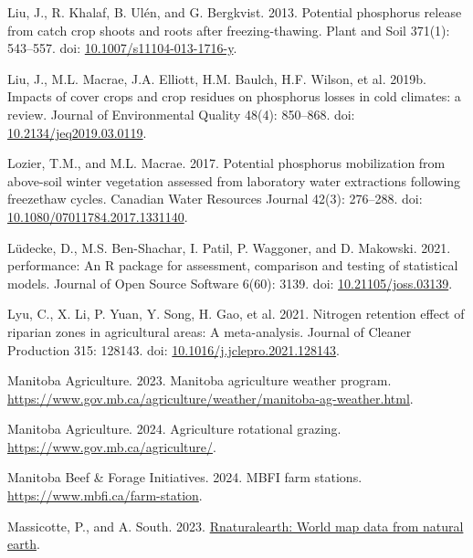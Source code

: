 \documentclass[
]{agujournal2019}
\newlength{\cslhangindent}
\newenvironment{CSLReferences}[2] %
 {\begin{list}{}{%
  \setlength{\itemindent}{0pt}
  \setlength{\leftmargin}{0pt}
  \setlength{\parsep}{0pt}
  \ifodd #1
   \setlength{\leftmargin}{\cslhangindent}
   \setlength{\itemindent}{-1\cslhangindent}
  \fi
  \setlength{\itemsep}{#2\baselineskip}}}
 {\end{list}}
\begin{document}
\begin{CSLReferences}{1}{1}
Liu, J., R. Khalaf, B. Ulén, and G. Bergkvist. 2013. Potential
phosphorus release from catch crop shoots and roots after
freezing-thawing. Plant and Soil 371(1): 543--557. doi:
\href{https://doi.org/10.1007/s11104-013-1716-y}{10.1007/s11104-013-1716-y}.

Liu, J., M.L. Macrae, J.A. Elliott, H.M. Baulch, H.F. Wilson, et al.
2019b. Impacts of cover crops and crop residues on phosphorus losses in
cold climates: a review. Journal of Environmental Quality 48(4):
850--868. doi:
\href{https://doi.org/10.2134/jeq2019.03.0119}{10.2134/jeq2019.03.0119}.

Lozier, T.M., and M.L. Macrae. 2017. Potential phosphorus mobilization
from above-soil winter vegetation assessed from laboratory water
extractions following freeze{\textendash}thaw cycles. Canadian Water
Resources Journal 42(3): 276--288. doi:
\href{https://doi.org/10.1080/07011784.2017.1331140}{10.1080/07011784.2017.1331140}.

Lüdecke, D., M.S. Ben-Shachar, I. Patil, P. Waggoner, and D. Makowski.
2021. {performance}: An {R} package for assessment, comparison and
testing of statistical models. Journal of Open Source Software 6(60):
3139. doi:
\href{https://doi.org/10.21105/joss.03139}{10.21105/joss.03139}.

Lyu, C., X. Li, P. Yuan, Y. Song, H. Gao, et al. 2021. Nitrogen
retention effect of riparian zones in agricultural areas: A
meta-analysis. Journal of Cleaner Production 315: 128143. doi:
\href{https://doi.org/10.1016/j.jclepro.2021.128143}{10.1016/j.jclepro.2021.128143}.

Manitoba Agriculture. 2023. Manitoba agriculture weather program.
\url{https://www.gov.mb.ca/agriculture/weather/manitoba-ag-weather.html}.

Manitoba Agriculture. 2024. Agriculture rotational grazing.
\url{https://www.gov.mb.ca/agriculture/}.

Manitoba Beef \& Forage Initiatives. 2024. MBFI farm stations.
\url{https://www.mbfi.ca/farm-station}.

Massicotte, P., and A. South. 2023.
\href{https://CRAN.R-project.org/package=rnaturalearth}{Rnaturalearth:
World map data from natural earth}.


\end{CSLReferences}
\end{document}
